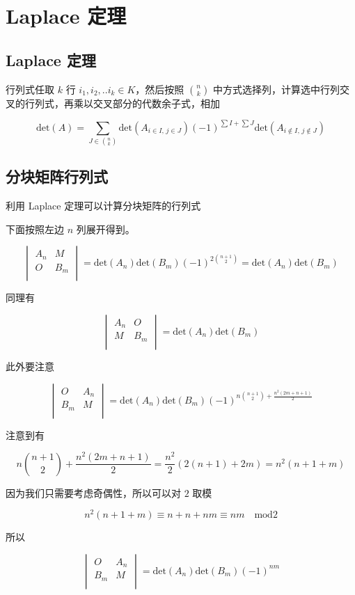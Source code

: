 \documentclass[12pt,a4paper]{ctexart}
\begin{document}
\section{Laplace 定理}

\subsection{Laplace 定理}

行列式任取 $k$ 行 $i_1, i_2, .. i_k \in K$，然后按照 $\binom{n}{k}$ 中方式选择列，计算选中行列交叉的行列式，再乘以交叉部分的代数余子式，相加

\[
\text{det}(A) = \sum_{J \in \binom{n}{k}} \text{det}(A_{i \in I,\, j \in J})(-1)^{\sum I + \sum J} \text{det}(A_{i \notin I,\, j \notin J})
\]

\subsection{分块矩阵行列式}

利用 Laplace 定理可以计算分块矩阵的行列式

下面按照左边 $n$ 列展开得到。

\[
\begin{vmatrix}
    A_n & M \\
    O & B_m \\
\end{vmatrix} = \text{det}(A_n) \text{det}(B_m) (-1)^{2\binom{n+1}{2}} = \text{det}(A_n)\text{det}(B_m)
\]

同理有


\[
\begin{vmatrix}
    A_n & O \\
    M & B_m \\
\end{vmatrix} = \text{det}(A_n) \text{det}(B_m)
\]

此外要注意


\[
\begin{vmatrix}
    O & A_n \\
    B_m & M \\
\end{vmatrix} = \text{det}(A_n) \text{det}(B_m)(-1)^{n\binom{n+1}{2} + \frac{n^2(2m + n+1)}{2}}
\]

注意到有

\[
n\binom{n+1}{2} + \frac{n^2(2m + n+1)}{2} = \frac{n^2}{2}(2(n+1) + 2m ) = n^2(n+1 + m)
\]

因为我们只需要考虑奇偶性，所以可以对 $2$ 取模

\[
n^2(n+1+m) \equiv n + n + nm \equiv nm \quad \text{mod} 2
\]

所以

\[
\begin{vmatrix}
    O & A_n \\
    B_m & M \\
\end{vmatrix} = \text{det}(A_n) \text{det}(B_m)(-1)^{nm}
\]
\end{document}
